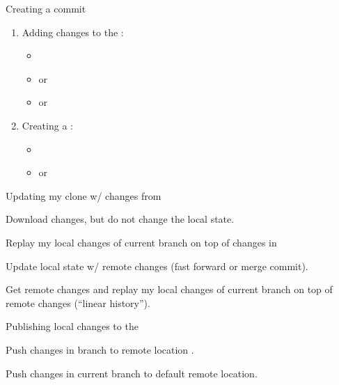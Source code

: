\begin{frame}{Creating a commit}
\begin{enumerate}
\item Adding changes to the :
\begin{itemize}
\item {}
\item {} or 
\item {} or 
\end{itemize}
\item Creating a :
\begin{itemize}
\item {}
\item {} or 
\end{itemize}
\end{enumerate}
\end{frame}

\begin{frame}{Updating my clone w/ changes from }
\begin{block}{}
Download changes, but do not change the local state.
\end{block}
\begin{block}{}
Replay my local changes of current branch on top of changes in 
\end{block}
\begin{block}{}
Update local state w/ remote changes (fast forward or merge commit).
\end{block}
\begin{block}{}
Get remote changes and replay my local changes of current branch on top of remote changes (``linear history'').
\end{block}
\end{frame}

\begin{frame}{Publishing local changes to the }
\begin{block}{}
Push changes in branch  to remote location .
\end{block}
\begin{block}{}
Push changes in current branch to default remote location.
\end{block}
\end{frame}

